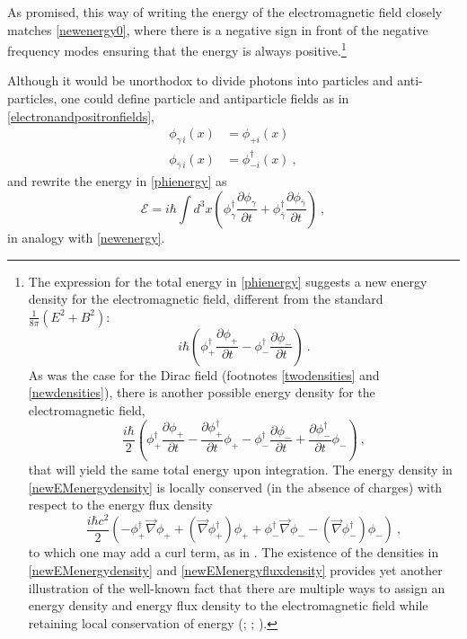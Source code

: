 \documentclass[12pt,secnumarabic,amsmath,amssymb,balancelastpage,nofootinbib]{article}
\newcommand{\del}[0]{\ensuremath{\vec{\nabla}}}
\begin{document}
As promised, this way of writing the energy of the electromagnetic field closely matches \eqref{newenergy0}, where there is a negative sign in front of the negative frequency modes ensuring that the energy is always positive.\footnote{The expression for the total energy in \eqref{phienergy} suggests a new energy density for the electromagnetic field, different from the standard $\frac{1}{8\pi}(E^2 + B^2)$:
\begin{equation}
i \hbar \left(\phi^{\dagger}_+ \frac{\partial\phi_+}{\partial t} - \phi^{\dagger}_- \frac{\partial \phi_-}{\partial t} \right)
\ .
\end{equation}
As was the case for the Dirac field (footnotes \ref{twodensities} and \ref{newdensities}), there is another possible energy density for the electromagnetic field,
\begin{equation}
\frac{i \hbar}{2} \left(\phi^{\dagger}_+ \frac{\partial\phi_+}{\partial t} -\frac{\partial\phi^{\dagger}_+}{\partial t} \phi_+ - \phi^{\dagger}_- \frac{\partial \phi_-}{\partial t} + \frac{\partial\phi^{\dagger}_-}{\partial t} \phi_-\right)
\ ,
\label{newEMenergydensity}
\end{equation}
that will yield the same total energy upon integration.  The energy density in \eqref{newEMenergydensity} is locally conserved (in the absence of charges) with respect to the energy flux density
\begin{equation}
\frac{i \hbar c^2}{2}\left(-\phi^{\dagger}_{+} \del \phi_{+} + (\del \phi^{\dagger}_{+}) \phi_{+}  + \phi^{\dagger}_{-} \del \phi_{-} - (\del \phi^{\dagger}_{-})\phi_{-} \right)
\label{newEMenergyfluxdensity}
\ ,
\end{equation}
to which one may add a curl term, as in \citet[eq.\ 13]{ohanian}.  The existence of the densities in \eqref{newEMenergydensity} and \eqref{newEMenergyfluxdensity} provides yet another illustration of the well-known fact that there are multiple ways to assign an energy density and energy flux density to the electromagnetic field while retaining local conservation of energy (\citealp[sec.\ 31-33]{landaulifshitzfields}; \citealp[sec.\ 6.7 and 12.10]{jackson}; \citealp[ch.\ 5]{lange}).}



Although it would be unorthodox to divide photons into particles and anti-particles, one could define particle and antiparticle fields as in \eqref{electronandpositronfields},
\begin{align}
\phi_{\gamma \, i}(x)&=\phi_{+ i}(x)
\nonumber
\\
\phi_{\bar{\gamma} \, i}(x)&=\phi^{\dagger}_{- i}(x)
\ ,
\end{align}
and rewrite the energy in \eqref{phienergy} as
\begin{equation}
\mathcal{E}=i \hbar \int{d^3 x \left( \phi_{\gamma}^{\dagger}\frac{\partial \phi_{\gamma}}{\partial t} + \phi_{\bar{\gamma}}^{\dagger}\frac{\partial \phi_{\bar{\gamma}}}{\partial t}\right)}
\ ,
\end{equation}
in analogy with \eqref{newenergy}.
\end{document}
